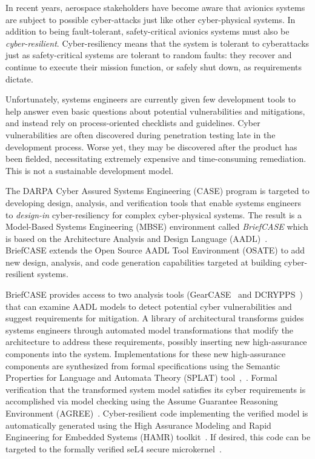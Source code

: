 In recent years, aerospace stakeholders have become aware that avionics systems are subject to possible cyber-attacks just like other cyber-physical systems.  In addition to being fault-tolerant, safety-critical avionics systems must also be {\em cyber-resilient}. Cyber-resiliency means that the system is tolerant to cyberattacks just as safety-critical systems are tolerant to random faults: they recover and continue to execute their mission function, or safely shut down, as requirements dictate. 

Unfortunately, systems engineers are currently given few development tools to help answer even basic questions about potential vulnerabilities and mitigations, and instead rely on process-oriented checklists and guidelines.  Cyber vulnerabilities are often discovered during penetration testing late in the development process.  Worse yet, they may be discovered after the product has been fielded, necessitating extremely expensive and time-consuming remediation. This is not a sustainable development model.

The DARPA Cyber Assured Systems Engineering (CASE) program is targeted to developing design, analysis, and verification tools that enable systems engineers to {\em design-in} cyber-resiliency for complex cyber-physical systems.
The result is a Model-Based Systems Engineering (MBSE) environment called {\em BriefCASE} which is based on the Architecture Analysis and Design Language (AADL)~\cite{aadl}.  BriefCASE extends the Open Source AADL Tool Environment (OSATE) to add new design, analysis, and code generation capabilities targeted at building cyber-resilient systems.  

BriefCASE provides access to two analysis tools (GearCASE~\cite{gearcase2020} and DCRYPPS~\cite{dcrypps2019}) that can examine AADL models to detect potential cyber vulnerabilities and suggest requirements for mitigation.  
A library of architectural transforms guides systems engineers through automated model transformations that modify the architecture to address these requirements, possibly inserting new high-assurance components into the system. 
Implementations for these new high-assurance components are synthesized from formal specifications using the Semantic Properties for Language and Automata Theory (SPLAT) tool~\cite{slind-hcss2020},~\cite{formal-filter-synth-langsec}.
Formal verification that the transformed system model satisfies its cyber requirements is accomplished via model checking using the Assume Guarantee Reasoning Environment (AGREE)~\cite{agree2013}.  Cyber-resilient code implementing the verified model is automatically generated using the High Assurance Modeling and Rapid Engineering for Embedded Systems (HAMR) toolkit~\cite{hamr}.  If desired, this code can be targeted to the formally verified seL4 secure microkernel~\cite{sel4-2009}.

